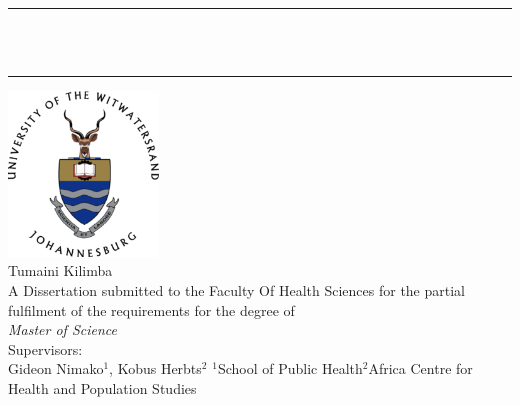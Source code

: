\begin{titlepage}
\begin{center}
\vspace*{0.1cm}
\rule[9mm]{\textwidth}{2pt}\\
\\
\rule[-7mm]{\textwidth}{2pt}

\vspace*{1cm}
\noindent \includegraphics[width=4cm]{logo} %
\mbox{} \\\vspace*{1cm} 
\noindent \LARGE Tumaini Kilimba \\\vspace*{1.4cm}
\noindent \large A Dissertation submitted to the Faculty Of Health Sciences for the partial fulfilment of the requirements for the
degree of\\%
\noindent \LARGE \textit{Master of Science} \\\vspace*{0.4cm} 
\vspace*{1cm}
\noindent \large {Supervisors: \\\vspace*{0.1cm}  Gideon Nimako$^1$, Kobus Herbts$^2$}
\vfill
\vspace*{1cm}
\noindent \footnotesize{{$^1$School of Public Health\hfill $^2$Africa Centre for Health and Population Studies \\}
}


\end{center}
\end{titlepage}
\restoregeometry
\sloppy\pagebreak


